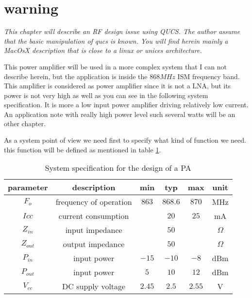 %
%
%
%

\section*{warning}

\textit{
This chapter will describe an RF design issue using QUCS. The author assume that the basic manipulation of qucs is known. You will find herein mainly a MacOsX description that is close to a linux or unices architecture.
}


This power amplifier will be used in a more complex system that I can not describe herein, but the application is inside the $868MHz$ ISM frequency band. This amplifier is considered as power amplifier since it is not a LNA, but its power is not very high as well as you can see in the following system specification. It is more a low input power amplifier driving relatively low current. An application note with really high power level such several watts will be an other chapter.



As a system point of view we need first to specify what kind of function we need. this function will be defined as mentioned in table \ref{design:pa:systemSpecification}.


\begin{table}[htp]
\caption{System specification for the design of a PA}
\begin{center}
\begin{tabular}{|c|c|c|c|c|c|} \hline
parameter & description 					& min   & typ     & max   & unit \\ \hline \hline
$F_o$     & frequency of operation		& $863$ & $868.6$ & $870$ & MHz \\
$Icc$ 	   & current consumption        &       & $20$    & $25$    & mA \\ \hline
$Z_{in}$  & input impedance            &       & $50$    &        & $\Omega$ \\
$Z_{out}$  & output impedance            &       & $50$    &        & $\Omega$ \\ \hline
$P_{in}$   & input power                &   $-15$ & $-10$ & $-8$ & dBm \\
$P_{out}$   & input power                &   $5$ & $10$ & $12$ & dBm \\ \hline
$V_{cc}$   & DC supply voltage                &   $2.45$ & $2.5$ & $2.55$ & V \\ \hline
\end{tabular}
\end{center}
\label{design:pa:systemSpecification}
\end{table}

